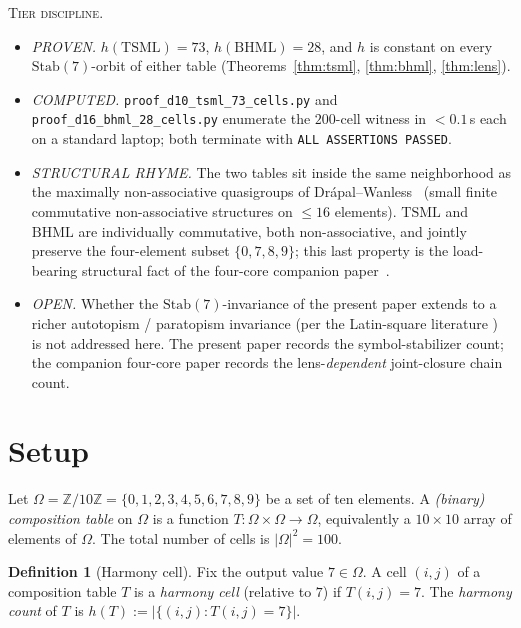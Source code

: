 \documentclass[11pt,reqno]{amsart}
\theoremstyle{plain}
\theoremstyle{definition}
\newtheorem{definition}[theorem]{Definition}
\theoremstyle{remark}
\newcommand{\Z}{\mathbb{Z}}
\newcommand{\Zten}{\Z/10\Z}
\newcommand{\TSML}{\mathrm{TSML}}
\newcommand{\BHML}{\mathrm{BHML}}
\begin{document}
\medskip\noindent
\textsc{Tier discipline.}
\begin{itemize}\setlength\itemsep{2pt}
\item \emph{PROVEN.} $h(\TSML) = 73$, $h(\BHML) = 28$, and $h$ is
constant on every $\mathrm{Stab}(7)$-orbit of either table
(Theorems~\ref{thm:tsml}, \ref{thm:bhml}, \ref{thm:lens}).
\item \emph{COMPUTED.} \texttt{proof\_d10\_tsml\_73\_cells.py} and
\texttt{proof\_d16\_bhml\_28\_cells.py} enumerate the
$200$-cell witness in $<\!0.1$\,s each on a standard laptop;
both terminate with \texttt{ALL ASSERTIONS PASSED}.
\item \emph{STRUCTURAL RHYME.} The two tables sit inside the same
neighborhood as the maximally non-associative quasigroups of
Dr\'apal--Wanless~\cite{DrapalWanless2021} (small finite
commutative non-associative structures on $\le 16$ elements).
$\TSML$ and $\BHML$ are individually commutative, both
non-associative, and jointly preserve the four-element subset
$\{0, 7, 8, 9\}$; this last property is the load-bearing
structural fact of the four-core companion paper~\cite{FourCore}.
\item \emph{OPEN.} Whether the $\mathrm{Stab}(7)$-invariance of
the present paper extends to a richer autotopism / paratopism
invariance (per the Latin-square literature
\cite{McKayWanless2005,DrapalWanless2021}) is not addressed
here. The present paper records the symbol-stabilizer count;
the companion four-core paper records the lens-\emph{dependent}
joint-closure chain count.
\end{itemize}

\section{Setup}\label{sec:setup}

Let $\Omega = \Zten = \{0, 1, 2, 3, 4, 5, 6, 7, 8, 9\}$ be a set of
ten elements. A \emph{(binary) composition table} on $\Omega$ is a
function $T : \Omega \times \Omega \to \Omega$, equivalently a
$10 \times 10$ array of elements of $\Omega$. The total number of
cells is $|\Omega|^2 = 100$.

\begin{definition}[Harmony cell]\label{def:harm}
Fix the output value $7 \in \Omega$. A cell $(i, j)$ of a
composition table $T$ is a \emph{harmony cell} (relative to $7$) if
$T(i, j) = 7$. The \emph{harmony count} of $T$ is
$h(T) := \bigl|\{(i, j) : T(i, j) = 7\}\bigr|$.
\end{definition}
\end{document}

